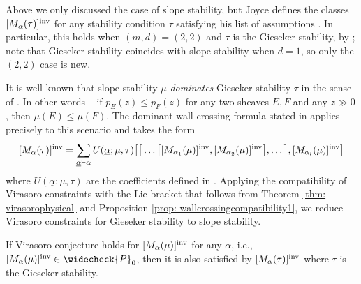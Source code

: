 \documentclass[a4paper, 12pt]{amsart}
\begin{document}
Above we only discussed the case of slope stability, but Joyce defines the classes $[M_{\alpha}(\tau)]^{\mathrm{inv}}$ for any stability condition $\tau$ satisfying his list of assumptions \cite[Assumption 5.1 and 5.2]{Jo21}. In particular, this holds when $(m,d) = (2,2)$ and $\tau$ is the Gieseker stability, by \cite[Section 7]{Jo21}; note that Gieseker stability coincides with slope stability when $d=1$, so only the $(2,2)$ case is new. 

It is well-known that slope stability $\mu$ \textit{dominates} Gieseker stability $\tau$ in the sense of \cite[Definition 3.8]{Jo21}.  In other words -- if $p_E(z)\leq p_F(z)$ for any two sheaves $E,F$ and any $z\gg 0$, then $\mu(E)\leq \mu(F)$. The dominant wall-crossing formula stated in \cite[Theorem 5.8, Theorem 7.64]{Jo21} applies precisely to this scenario and takes the form 
$$
[M_{\alpha}(\tau)]^{\mathrm{inv}}=\sum_{\underline{\alpha}\vdash \alpha
}U(\underline{\alpha};\mu,\tau)
\big[\big[\ldots  \big[ [M_{\alpha_1}(\mu)]^{\mathrm{inv}},[M_{\alpha_2}(\mu)]^{\mathrm{inv}} \big],\ldots \big ],[M_{\alpha_l}(\mu)]^{\mathrm{inv}} \big]
$$
where $U(\underline{\alpha};\mu,\tau)$ are the coefficients defined in  \cite[Section 3.2]{Jo21}.  Applying the compatibility of Virasoro constraints with the Lie bracket that follows from Theorem \ref{thm: virasorophysical} and Proposition \ref{prop: wallcrossingcompatibility1}, we reduce Virasoro constraints for Gieseker stability to slope stability.
\begin{corollary}
\label{cor:slopetogies}
    If Virasoro conjecture holds for $[M_{\alpha}(\mu)]^{\mathrm{inv}}$ for any $\alpha$, i.e., $[M_{\alpha}(\mu)]^{\inva}\in \widecheck{P}_0$, then it is also satisfied by $[M_{\alpha}(\tau)]^{\mathrm{inv}}$ where $\tau$ is the Gieseker stability.
\end{corollary}


\end{document}

